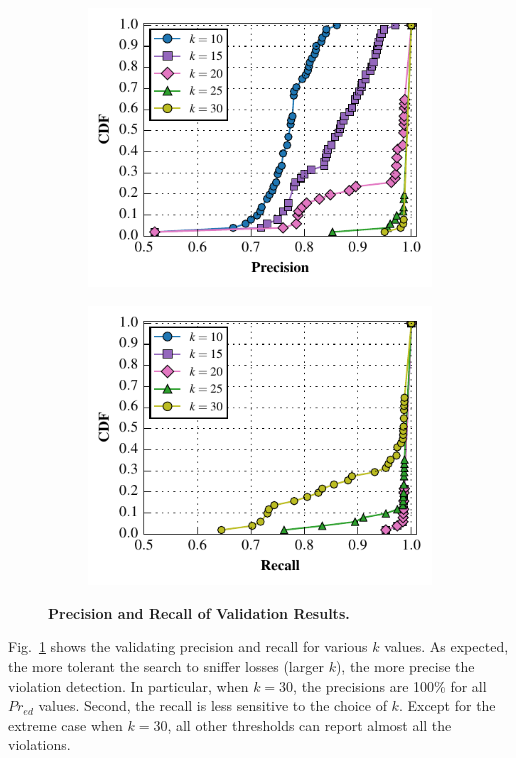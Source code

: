 \begin{figure}
  \vspace*{-5mm}
  \centering
  \begin{subfigure}{0.48\textwidth}
  \includegraphics[width=\textwidth]{./figures/scripts/PrecisionFigure.pdf}
\end{subfigure}
  \begin{subfigure}{0.48\textwidth}
  \includegraphics[width=\textwidth]{./figures/scripts/RecallFigure.pdf}
\end{subfigure}
  \caption{\textbf{Precision and Recall of Validation Results.}}
  \label{fig:precision}
  \vspace*{-5mm}
\end{figure}

Fig.~\ref{fig:precision} shows the validating precision and recall for various
$k$ values.
As expected, the more tolerant the search to sniffer
losses (larger $k$), the more precise the violation detection.
In particular,
when $k=30$, the precisions are 100\% for all $Pr_{ed}$ values.
Second, the recall is less sensitive to the choice of $k$.
Except for the extreme case when $k=30$, all other thresholds can report almost
all the violations.
